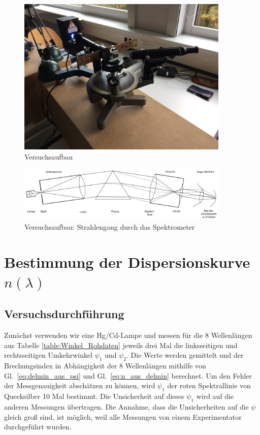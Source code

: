 \documentclass[12pt,a4paper]{article}
\begin{document}
\begin{figure}[H]
	\centering
	\includegraphics[width=0.9\textwidth]{Aufbau_Foto.jpg}
	\caption{Versuchsaufbau}
	\label{Aufbau_Foto}
\end{figure}
\begin{figure}[H]
	\centering
	\includegraphics[width=0.9\textwidth]{Spektrometer_Aufbau.png}
	\caption{Versuchsaufbau: Strahlengang durch das Spektrometer}
	\label{Spektrometer_Aufbau}
\end{figure}

\section{Bestimmung der Dispersionskurve $n(\lambda)$}

\subsection{Versuchsdurchführung}

Zunächst verwenden wir eine Hg/Cd-Lampe und messen für die 8 Wellenlängen aus Tabelle \ref{table:Winkel_Rohdaten} jeweils drei Mal die linksseitigen und rechtsseitigen Umkehrwinkel $\psi_1$ und $\psi_2$. Die Werte werden gemittelt und der Brechungsindex in Abhängigkeit der 8 Wellenlängen mithilfe von Gl.~\eqref{eq:delmin_aus_psi} und Gl.~\eqref{eq:n_aus_delmin} berechnet. Um den Fehler der Messgenauigkeit abschätzen zu können, wird $\psi_1$ der roten Spektrallinie von Quecksilber 10 Mal bestimmt. Die Unsicherheit auf dieses $\psi_1$ wird auf die anderen Messungen übertragen. Die Annahme, dass die Unsicherheiten auf die $\psi$ gleich groß sind, ist möglich, weil alle Messungen von einem Experimentator durchgeführt wurden.
\end{document}
